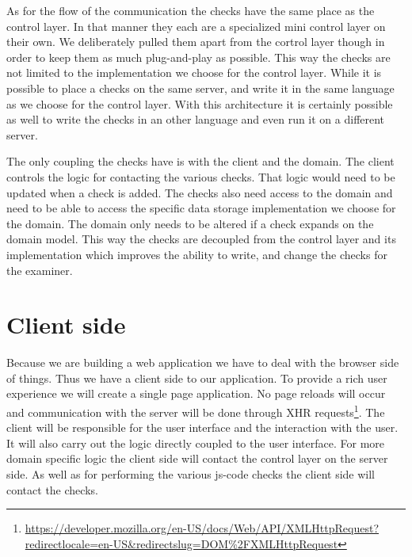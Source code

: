 As for the flow of the communication
the \glspl{check} have the same place as the control layer.
In that manner they each are a specialized mini control layer on their own.
We deliberately pulled them apart from the cortrol layer though
in order to keep them as much plug-and-play as possible.
This way the \glspl{check} are not limited
to the implementation we choose for the control layer.
While it is possible to place a \glspl{check} on the same server,
and write it in the same language as we choose for the control layer.
With this architecture it is certainly possible as well
to write the \glspl{check} in an other language
and even run it on a different server.

The only coupling the \glspl{check} have is with the client and the domain.
The client controls the logic for contacting the various \glspl{check}.
That logic would need to be updated when a \gls{check} is added.
The \glspl{check} also need access to the domain
and need to be able to access
the specific data storage implementation we choose for the domain.
The domain only needs to be altered if a \gls{check} expands on the domain model.
This way the \glspl{check} are decoupled from the control layer
and its implementation which improves the ability to write, and change 
the \glspl{check} for the \gls{examiner}. 

\section{Client side}
Because we are building a web application
we have to deal with the browser side of things.
Thus we have a client side to our application.
To provide a rich user experience we will create a single page application.
No page reloads will occur
and communication with the server will be done through
XHR requests\footnote{\url{https://developer.mozilla.org/en-US/docs/Web/API/XMLHttpRequest?redirectlocale=en-US&redirectslug=DOM\%2FXMLHttpRequest}}.
The client will be responsible for the user interface
and the interaction with the user.
It will also carry out the logic directly coupled to the user interface.
For more domain specific logic
the client side will contact the control layer on the server side.
As well as for performing the various \gls{js-code} \glspl{check}
the client side will contact the \glspl{check}.

